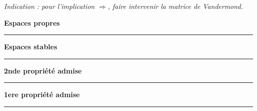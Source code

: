 \noindent
{\eightpts \it Indication : pour l'implication $\Longrightarrow$, faire intervenir la matrice de Vandermond. } 
\bigskip

\centerline{\bf Espaces propres}
\hrule
\bigskip
{}%
\bigskip

\centerline{\bf Espaces stables}
\hrule
\bigskip
{}%
\bigskip
\goodbreak
\centerline{\bf 2nde propri\'et\'e admise}
\hrule
\bigskip
{}%
\bigskip
\centerline{\bf 1ere propri\'et\'e admise}
\hrule

%
\bye









